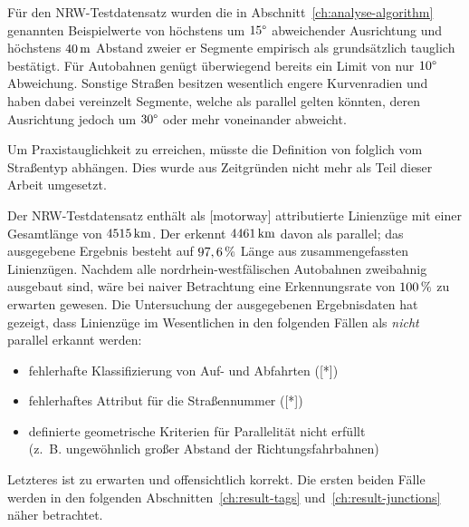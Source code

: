 \documentclass[../main/thesis.tex]{subfiles}
\begin{document}
Für den NRW-Testdatensatz wurden die in Abschnitt~\ref{ch:analyse-algorithm} genannten Beispielwerte von höchstens um $15\degree$ abweichender Ausrichtung und höchstens $\unit[40]{m}$ Abstand zweier er Segmente empirisch als grundsätzlich tauglich bestätigt.
Für Autobahnen genügt überwiegend bereits ein Limit von nur $10\degree$ Abweichung.
Sonstige Straßen besitzen wesentlich engere Kurvenradien und haben dabei vereinzelt Segmente, welche als parallel gelten könnten, deren Ausrichtung jedoch um $30\degree$ oder mehr voneinander abweicht.



Um Praxistauglichkeit zu erreichen, müsste die Definition von  folglich vom Straßentyp abhängen.
Dies wurde aus Zeitgründen nicht mehr als Teil dieser Arbeit umgesetzt.

Der NRW-Testdatensatz enthält als [motorway] attributierte Linienzüge mit einer Gesamtlänge von $\unit[4515]{km}$.
Der  erkennt $\unit[4461]{km}$ davon als parallel; das ausgegebene Ergebnis besteht auf $\unit[97,6]{\%}$ Länge aus zusammengefassten Linienzügen.
Nachdem alle nordrhein-westfälischen Autobahnen zweibahnig ausgebaut sind, wäre bei naiver Betrachtung eine Erkennungsrate von $\unit[100]{\%}$ zu erwarten gewesen.
Die Untersuchung der ausgegebenen Ergebnisdaten hat gezeigt, dass Linienzüge im Wesentlichen in den folgenden Fällen als \emph{nicht} parallel erkannt werden:

\begin{itemize}[nosep]
\item fehlerhafte Klassifizierung von Auf- und Abfahrten ([*])
\item fehlerhaftes Attribut für die Straßennummer ([*])
\item definierte geometrische Kriterien für Parallelität nicht erfüllt \\(z.~B. ungewöhnlich großer Abstand der Richtungsfahrbahnen)
\end{itemize}
%
Letzteres ist zu erwarten und offensichtlich korrekt.
Die ersten beiden Fälle werden in den folgenden Abschnitten~\ref{ch:result-tags} und~\ref{ch:result-junctions} näher betrachtet.
\end{document}
